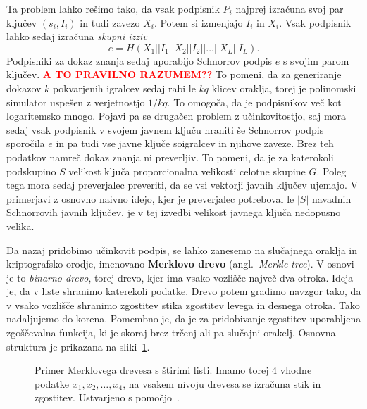 \documentclass[isrm2, tisk]{fmfdelo}
\newcommand{\todo}[1]{\textcolor{red}{\textbf{\uppercase{#1}??}}}
\begin{document}
Ta problem lahko rešimo tako, da vsak podpisnik $P_i$ najprej izračuna svoj par ključev $(s_i, I_i)$ 
in tudi zavezo $X_i$. Potem si izmenjajo $I_i$ in $X_i$. Vsak podpisnik lahko sedaj izračuna 
\textit{skupni izziv} 
$$ 
e = H(X_1 || I_1 || X_2 || I_2 || \dots || X_L || I_L).
$$
Podpisniki za dokaz znanja sedaj uporabijo Schnorrov podpis $e$ s svojim parom ključev. 
\todo{a to pravilno razumem}
To pomeni, da za generiranje dokazov $k$ pokvarjenih igralcev sedaj rabi le $kq$ klicev oraklja, 
torej je polinomski simulator uspešen z verjetnostjo $1/kq$. To omogoča, da je podpisnikov več 
kot logaritemsko mnogo. Pojavi pa se drugačen problem z učinkovitostjo, saj mora sedaj vsak podpisnik 
v svojem javnem ključu hraniti še Schnorrov podpis sporočila $e$ in pa tudi vse javne ključe 
soigralcev in njihove zaveze. Brez teh podatkov namreč dokaz znanja ni preverljiv. To pomeni, da je 
za katerokoli podskupino $S$ velikost ključa proporcionalna velikosti celotne skupine $G$. Poleg 
tega mora sedaj preverjalec preveriti, da se vsi vektorji javnih ključev ujemajo. V primerjavi 
z osnovno naivno idejo, kjer je preverjalec potreboval le $|S|$ navadnih Schnorrovih javnih ključev, 
je v tej izvedbi velikost javnega ključa nedopusno velika.

Da nazaj pridobimo učinkovit podpis, se lahko zanesemo na slučajnega oraklja in kriptografsko 
orodje, imenovano \textbf{Merklovo drevo} (angl.\ \textit{Merkle tree}). V osnovi je to 
\textit{binarno drevo}, torej drevo, kjer ima vsako vozlišče največ dva otroka. Ideja je, da v liste 
shranimo katerekoli podatke. Drevo potem gradimo navzgor tako, da v vsako vozlišče shranimo zgostitev 
stika zgostitev levega in desnega otroka. Tako nadaljujemo do korena. Pomembno je, da je za pridobivanje 
zgostitev uporabljena zgoščevalna funkcija, ki je skoraj brez trčenj ali pa slučajni orakelj. Osnovna 
struktura je prikazana na sliki~\ref{fig:merkle}.
\begin{figure}[h!]
  \centering
  \caption[Merklovo drevo.]{Primer Merklovega drevesa s štirimi listi. Imamo torej $4$ vhodne podatke
    $x_1, x_2, \dots, x_4$, na vsakem nivoju drevesa se izračuna stik in zgostitev. Ustvarjeno s 
    pomočjo~\cite{SOtikz}.}
  \label{fig:merkle}
\end{figure}
\end{document}
